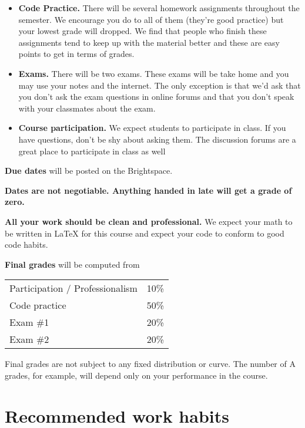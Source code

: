 \documentclass[12pt,pdftex,twoside,letterpaper]{exam}
\begin{document}
    \begin{itemize}
      \item {\bf Code Practice.} There will be several homework assignments throughout the
            semester. We encourage you do to all of them (they're good practice) but your lowest
            grade will dropped. We find that people who finish these assignments tend to keep up
            with the material better and these are easy points to get in terms of grades.
      \item {\bf Exams.} There will be two exams. These exams will be take home and you may use
            your notes and the internet. The only exception is that we'd ask that you don't ask
            the exam questions in online forums and that you don't speak with your classmates about
            the exam.
      \item {\bf Course participation.} We expect students to participate in class. If you have
            questions, don't be shy about asking them. The discussion forums are a great place to
            participate in class as well
    \end{itemize}


    {\bf Due dates} will be posted on the Brightspace.

    {\bf Dates are not negotiable. Anything handed in late will get a grade of zero.}

    {\bf All your work should be clean and professional.} We expect your math to be written in
    LaTeX for this course and expect your code to conform to good code habits.

    {\bf Final grades\/} will be computed from

    \begin{center}
      \begin{tabular}{ll}
        Participation / Professionalism & 10\% \\
        Code practice & 50\% \\
        Exam \#1        & 20\% \\
        Exam \#2        & 20\% \\
      \end{tabular}
    \end{center}

    Final grades are not subject to any fixed distribution or curve. The number of A grades, for
    example, will depend only on your performance in the course.

\section*{Recommended work habits}
\end{document}
